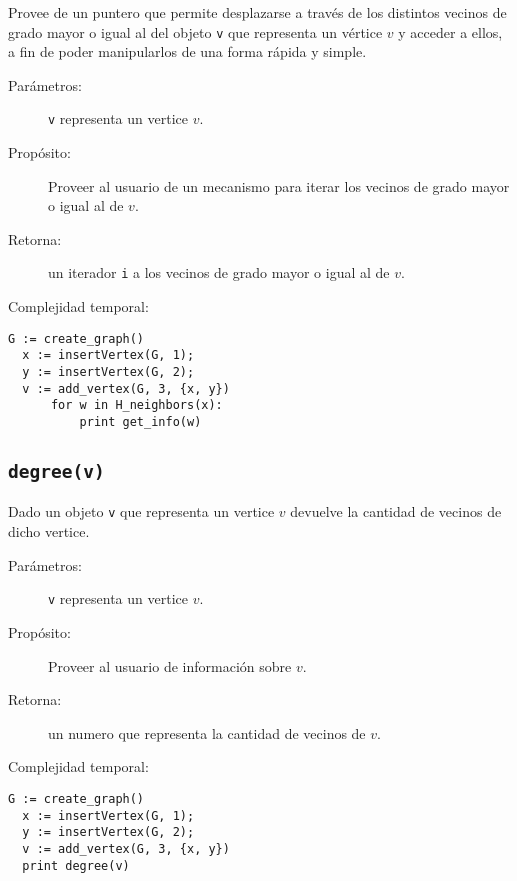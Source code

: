 \documentclass[a4paper,12pt]{article}
\makeatletter
\newcommand{\Code}[1]{\lstinline[basicstyle={\tt}]@#1@}
\makeatother
\begin{document}
Provee de un puntero que permite desplazarse a través de los distintos vecinos de grado mayor o igual al del objeto \texttt{v} que representa un vértice $v$ y acceder a ellos, a fin de poder manipularlos de una forma rápida y simple.

\begin{description}
  \item [Parámetros:] \Code{v} representa un vertice $v$.
  \item [Propósito:] Proveer al usuario de un mecanismo para iterar los vecinos de grado mayor o igual al de $v$.
  \item [Retorna:] un iterador \Code{i} a los vecinos de grado mayor o igual al de $v$.
  \item [Complejidad temporal:]
\end{description}


\begin{lstlisting}[caption={Ejemplo de uso de H\_neighbors. El código crea un grafo $G$ con el vertice 1, el vertice 2 y el vertice 3. Luego, mediante el iterador de $x$ se recorre sus vecinos de mayor o igual grado y el ciclo imprime ``3''.},gobble=2,float=ht,label={lst:pseudo:H_neighbors},emph={H_neighbors}]
  G := create_graph()
  x := insertVertex(G, 1);
  y := insertVertex(G, 2);
  v := add_vertex(G, 3, {x, y})
      for w in H_neighbors(x):
          print get_info(w)
\end{lstlisting}


\subsection{\Code{degree(v)}}
\label{sec:tad grafo:degree}

Dado un objeto \Code{v} que representa un vertice $v$ devuelve la cantidad de vecinos de dicho vertice. 

\begin{description}
  \item [Parámetros:] \Code{v} representa un vertice $v$.
  \item [Propósito:] Proveer al usuario de información sobre $v$.
  \item [Retorna:] un numero que representa la cantidad de vecinos de $v$.
  \item [Complejidad temporal:]
\end{description}


\begin{lstlisting}[caption={Ejemplo de uso de degree. El código crea un grafo $G$ con el vertice 1, el vertice 2 y el vertice 3. Luego se imprime el grado de $v$, es decir, ``2''.},gobble=2,float=ht,label={lst:pseudo:degree},emph={degree}]
  G := create_graph()
  x := insertVertex(G, 1);
  y := insertVertex(G, 2);
  v := add_vertex(G, 3, {x, y})
  print degree(v)
\end{lstlisting}
\end{document}
